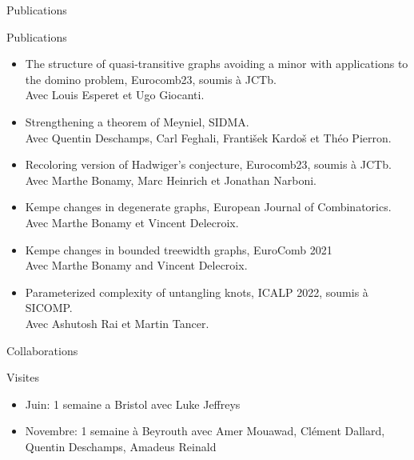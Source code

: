 \documentclass[10pt,xcolor=dvipsnames,presentation,aspectratio=169]{beamer}
\newcommand{\semitransp}[2][50]{\textcolor{fg!#1}{#2}}
\begin{document}
\begin{frame}{Publications}
  \begin{block}{Publications}
    \begin{itemize}
    \item The structure of quasi-transitive graphs avoiding a minor with
      applications to the domino problem, Eurocomb23, soumis à
      JCTb.\\
      Avec Louis Esperet et Ugo Giocanti.
    \item \semitransp{Strengthening a theorem of Meyniel, SIDMA.\\ Avec Quentin Deschamps, Carl
      Feghali, František Kardoš et Théo Pierron.}
    \item \semitransp{Recoloring version of Hadwiger's conjecture, Eurocomb23, soumis à
      JCTb.\\ Avec Marthe Bonamy, Marc Heinrich et Jonathan Narboni.}
    \item \semitransp{Kempe changes in degenerate graphs, European Journal of
      Combinatorics.\\ Avec Marthe Bonamy et Vincent Delecroix.}
    \item \semitransp{Kempe changes in bounded treewidth graphs, EuroComb 2021\\ Avec Marthe
      Bonamy and Vincent Delecroix.}
    \item \semitransp{Parameterized complexity of untangling knots, ICALP 2022, soumis à
      SICOMP.\\ Avec Ashutosh Rai et Martin Tancer.}
    \end{itemize}
  \end{block}
\end{frame}

\begin{frame}{Collaborations}
  \begin{block}{Visites}
    \begin{itemize}
    \item Juin: 1 semaine a Bristol avec Luke Jeffreys
    \item Novembre: 1 semaine à Beyrouth avec Amer Mouawad, Clément Dallard, Quentin Deschamps,
      Amadeus Reinald
    \end{itemize}
  \end{block}
 \vspace{-.2cm}
\end{frame}
\end{document}
